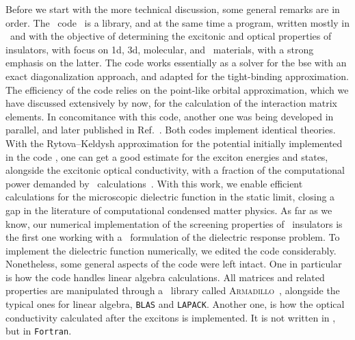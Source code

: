 Before we start with the more technical discussion, some general remarks are in order.
The \xatu~code~\cite{Xatu} is a library, and at the same time a program, written mostly in \CC~and with the objective of determining the excitonic and optical properties of insulators, with focus on \gls{1d}, \gls{3d}, molecular, and \bd~materials, with a strong emphasis on the latter.
The code works essentially as a solver for the \gls{bse} with an exact diagonalization approach, and adapted for the tight-binding approximation.
The efficiency of the code relies on the point-like orbital approximation, which we have discussed extensively by now, for the calculation of the interaction matrix elements.
In concomitance with this code, another one was being developed in parallel, and later published in Ref.~\cite{Dias_Silveira_Qu_2023}.
Both codes implement identical theories.
With the Rytova--Keldysh approximation for the potential initially implemented in the code \xatu, one can get a good estimate for the exciton energies and states, alongside the excitonic optical conductivity, with a fraction of the computational power demanded by \abinit~calculations~\cite{BerkeleyGW,Yambo_2009,Guandalini_Varsano_2023,Diana_PhD,Jornada_PhD}.
With this work, we enable efficient calculations for the microscopic dielectric function in the static limit, closing a gap in the literature of computational condensed matter physics.
As far as we know, our numerical implementation of the screening properties of \bd~insulators is the first one working with a \bd~formulation of the dielectric response problem.
To implement the dielectric function numerically, we edited the code considerably.
Nonetheless, some general aspects of the code were left intact.
One in particular is how the code handles linear algebra calculations.
All matrices and related properties are manipulated through a \CC~library called \textsc{Armadillo}~\cite{Armadillo_2016,Armadillo_2019}, alongside the typical ones for linear algebra, \texttt{BLAS} and \texttt{LAPACK}.
Another one, is how the optical conductivity calculated after the excitons is implemented.
It is not written in \CC, but in \texttt{Fortran}.

